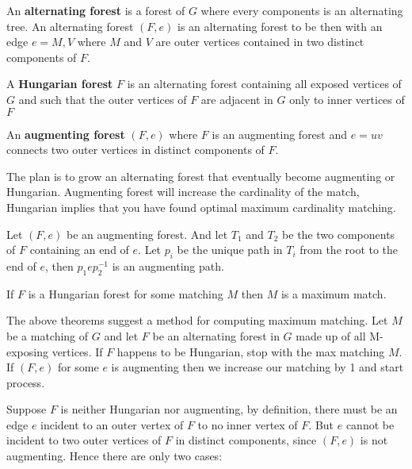 				\begin{definition}
					An \textbf{alternating forest} is a forest of $G$ where every components is an alternating tree. An alternating forest $(F, e)$ is an alternating forest to be then with an edge $e = M, V$ where $M$ and $V$ are outer vertices contained in two distinct components of $F$.
				\end{definition}

				\begin{example}
					A \textbf{Hungarian forest} $F$ is an alternating forest containing all exposed vertices of $G$ and such that the outer vertices of $F$ are adjacent in $G$ only to inner vertices of $F$
				\end{example}

				\begin{definition}
					An \textbf{augmenting forest} $(F, e)$ where $F$ is an augmenting forest and $e = uv$ connects two outer vertices in distinct components of $F$.
				\end{definition}

				The plan is to grow an alternating forest that eventually become augmenting or Hungarian. Augmenting forest will increase the cardinality of the match, Hungarian implies that you have found optimal maximum cardinality matching.

				\begin{theorem}
					Let $(F, e)$ be an augmenting forest. And let $T_1$ and $T_2$ be the two components of $F$ containing an end of $e$. Let $p_i$ be the unique path in $T_i$ from the root to the end of $e$, then $p_1ep_2^{-1}$ is an augmenting path.
				\end{theorem}

				\begin{theorem}
					If $F$ is a Hungarian forest for some matching $M$ then $M$ is a maximum match.
				\end{theorem}

				The above theorems suggest a method for computing maximum matching. Let $M$ be a matching of $G$ and let $F$ be an alternating forest in $G$ made up of all M-exposing vertices. If $F$ happens to be Hungarian, stop with the max matching $M$. If $(F, e)$ for some $e$ is augmenting then we increase our matching by 1 and start process.

				Suppose $F$ is neither Hungarian nor augmenting, by definition, there must be an edge $e$ incident to an outer vertex of $F$ to no inner vertex of $F$. But $e$ cannot be incident to two outer vertices of $F$ in distinct components, since $(F, e)$ is not augmenting. Hence there are only two cases:

